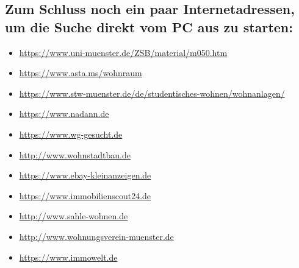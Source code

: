 \begin{multicols*}{2}
\subsection*{Zum Schluss noch ein paar Internetadressen, um die Suche direkt vom PC aus zu starten:}
\vspace{-1ex}
\begin{itemize}[leftmargin=0.8cm]
	\raggedright
	\item \url{https://www.uni-muenster.de/ZSB/material/m050.htm}
	\item \url{https://www.asta.ms/wohnraum}
    \item \url{https://www.stw-muenster.de/de/studentisches-wohnen/wohnanlagen/}
	\item \url{https://www.nadann.de}
	\item \url{https://www.wg-gesucht.de}
	\item \url{http://www.wohnstadtbau.de}
	\item \url{https://www.ebay-kleinanzeigen.de}
	\item \url{https://www.immobilienscout24.de}
	\item \url{http://www.sahle-wohnen.de}
	\item \url{http://www.wohnungsverein-muenster.de}
	\item \url{https://www.immowelt.de}
\end{itemize}





\end{multicols*}
